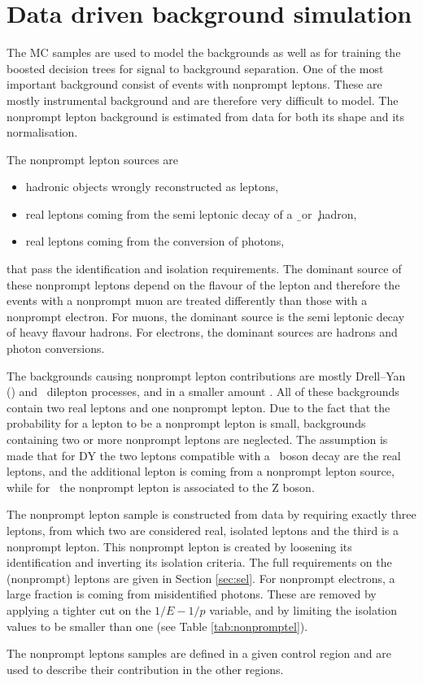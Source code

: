 \section{Data driven background simulation}
\label{sec:NPL}

The MC samples are used to model the backgrounds as well as for training the boosted decision trees
for signal to background separation. One of the most important background consist of events with nonprompt leptons. These are mostly instrumental background and are therefore very difficult to model. The nonprompt lepton background is estimated from data for both its shape and its normalisation. 

The nonprompt lepton sources are 
\begin{itemize}
	\item hadronic objects wrongly reconstructed as leptons, 
	\item real leptons coming from the semi leptonic decay of a \b\ or \c\ hadron,
	\item real leptons coming from the conversion of photons, 
\end{itemize}
that pass the identification and isolation requirements. The dominant source of these nonprompt leptons depend on the flavour of the lepton and therefore the events with a nonprompt muon are treated differently than those with a nonprompt electron. For muons, the dominant source is the semi leptonic decay of heavy flavour hadrons. For electrons, the dominant sources are hadrons and photon conversions. 

The backgrounds causing nonprompt lepton contributions are mostly Drell--Yan (\DY) and \ttbar\ dilepton processes, and in a smaller amount \WW. All of these backgrounds contain two real leptons and one nonprompt lepton. Due to the fact that the probability for a lepton to be a nonprompt lepton is small, backgrounds containing two or more nonprompt leptons are neglected. The assumption is made that for DY the two leptons compatible with a \PZ\ boson decay are the real leptons, and the additional lepton is coming from a nonprompt lepton source, while for \ttbar\ the nonprompt lepton is associated to the Z boson. 

The nonprompt lepton sample is constructed from data by requiring exactly three leptons, from which two are considered real, isolated leptons and the third is a nonprompt lepton. This nonprompt lepton is created by loosening its identification and inverting its isolation criteria. The full requirements on the (nonprompt) leptons are given in Section \ref{sec:sel}. 
For nonprompt electrons, a large fraction is coming from misidentified photons. These are removed by applying a tighter cut on the $1/E-1/p$ variable, and by limiting the isolation values to be smaller than one (see Table \ref{tab:nonpromptel}). 

The nonprompt leptons samples are defined in a given control region and are used to describe their contribution in the other regions. 
